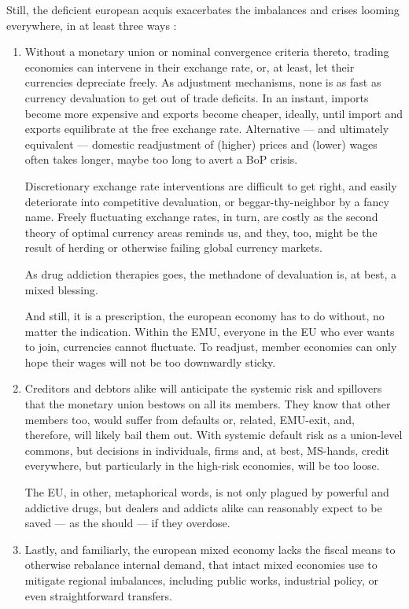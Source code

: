 \documentclass[11pt,a4paper,oneside,openright]{article}
\begin{document}
Still, the deficient european acquis exacerbates the imbalances and crises looming everywhere, in at least three ways \citep[echoed by][25]{Bordo2011}:
\begin{enumerate}
	\item Without a monetary union or nominal convergence criteria thereto, trading economies can intervene in their exchange rate, or, at least, let their currencies depreciate freely. 
	As adjustment mechanisms, none is as fast as currency devaluation to get out of trade deficits. 
	In an instant, imports become more expensive and exports become cheaper, ideally, until import and exports equilibrate at the free exchange rate. 
	Alternative --- and ultimately equivalent --- domestic readjustment of (higher) prices and (lower) wages often takes longer, maybe too long to avert a \gls{BoP} crisis. 
	
	Discretionary exchange rate interventions are difficult to get right, and easily deteriorate into competitive devaluation, or beggar-thy-neighbor by a fancy name. %
	Freely fluctuating exchange rates, in turn, are costly as the second theory of optimal currency areas reminds us, %
	and they, too, might be the result of herding or otherwise failing global currency markets.
	
	As drug addiction therapies goes, the methadone of devaluation is, at best, a mixed blessing.
	
	And still, it is a prescription, the european economy has to do without, no matter the indication. 
	Within the \gls{EMU}, everyone in the \gls{EU} who ever wants to join, currencies cannot fluctuate. 
	To readjust, member economies can only hope their wages will not be too downwardly sticky.
	
	\item Creditors and debtors alike will anticipate the systemic risk and spillovers that the monetary union bestows on all its members. 
	They know that other members too, would suffer from defaults or, related, \gls{EMU}-exit, and, therefore, will likely bail them out. 
	With systemic default risk as a union-level commons, but decisions in individuals, firms and, at best, \gls{MS}-hands, credit everywhere, but particularly in the high-risk economies, will be too loose.
	
	The \gls{EU}, in other, metaphorical words, is not only plagued by powerful and addictive drugs, but dealers and addicts alike can reasonably expect to be saved --- as the should --- if they overdose.
	
	\item Lastly, and familiarly, the european mixed economy lacks the fiscal means to otherwise rebalance internal demand, that intact mixed economies use to mitigate regional imbalances, including public works, industrial policy, or even straightforward transfers.
\end{enumerate}
\end{document}

